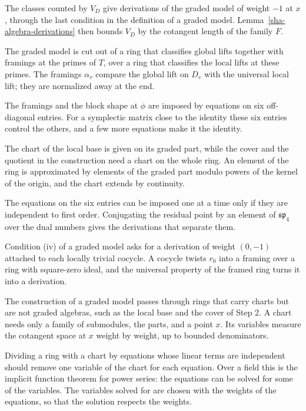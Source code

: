 The classes counted by $V_D$ give derivations of the graded model of weight $-1$ at $x$, through the last condition in the definition of a graded model. Lemma~\ref{sha-algebra-derivations} then bounds $V_D$ by the cotangent length of the family $F$.

The graded model is cut out of a ring that classifies global lifts together with framings at the primes of $T$, over a ring that classifies the local lifts at these primes. The framings $\alpha_v$ compare the global lift on $D_v$ with the universal local lift; they are normalized away at the end.

The framings and the block shape at $\phi$ are imposed by equations on six off-diagonal entries. For a symplectic matrix close to the identity these six entries control the others, and a few more equations make it the identity.

The chart of the local base is given on its graded part, while the cover and the quotient in the construction need a chart on the whole ring. An element of the ring is approximated by elements of the graded part modulo powers of the kernel of the origin, and the chart extends by continuity.

The equations on the six entries can be imposed one at a time only if they are independent to first order. Conjugating the residual point by an element of $\mathfrak{sp}_4$ over the dual numbers gives the derivations that separate them.

Condition (iv) of a graded model asks for a derivation of weight $(0,-1)$ attached to each locally trivial cocycle. A cocycle twists $r_0$ into a framing over a ring with square-zero ideal, and the universal property of the framed ring turns it into a derivation.

The construction of a graded model passes through rings that carry charts but are not graded algebras, such as the local base and the cover of Step 2. A chart needs only a family of submodules, the parts, and a point $x$. Its variables measure the cotangent space at $x$ weight by weight, up to bounded denominators.

Dividing a ring with a chart by equations whose linear terms are independent should remove one variable of the chart for each equation. Over a field this is the implicit function theorem for power series: the equations can be solved for some of the variables. The variables solved for are chosen with the weights of the equations, so that the solution respects the weights.

